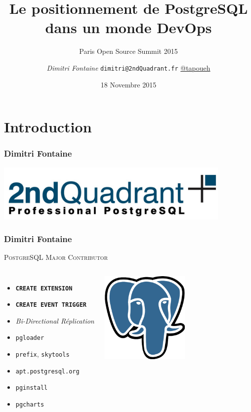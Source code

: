 \documentclass{beamer}
\title{Le positionnement de PostgreSQL dans un monde DevOps}
\subtitle{Paris Open Source Summit 2015}
\author{\textit{Dimitri Fontaine} \texttt{dimitri@2ndQuadrant.fr}
  \linebreak
  \url{@tapoueh}}
\date{18 Novembre 2015}
\begin{document}
\frame{\titlepage}

\section{Introduction}

\begin{frame}
  \frametitle{Dimitri Fontaine}

  \begin{center}
    \includegraphics[height=1.1in]{2ndquadrant_logo_full_color.jpg}
  \end{center}
\end{frame}

\begin{frame}[fragile]
  \frametitle{Dimitri Fontaine}

  \begin{center}
    {\Large \textsc{PostgreSQL Major Contributor}}
  \end{center}

  \begin{columns}[c]

    \begin{itemize}
    \item \texttt{\textbf{CREATE EXTENSION}}
    \item \texttt{\textbf{CREATE EVENT TRIGGER}}
    \item \textit{Bi-Directional Réplication}
    \item \texttt{pgloader}
    \item \texttt{prefix}, \texttt{skytools}
    \item \texttt{apt.postgresql.org}
    \item \texttt{pginstall}
    \item \texttt{pgcharts}
    \end{itemize}  

    \begin{center}
      \includegraphics[height=12em]{postgres-logo.eps}
    \end{center}
  \end{columns}
\end{frame}
\end{document}
